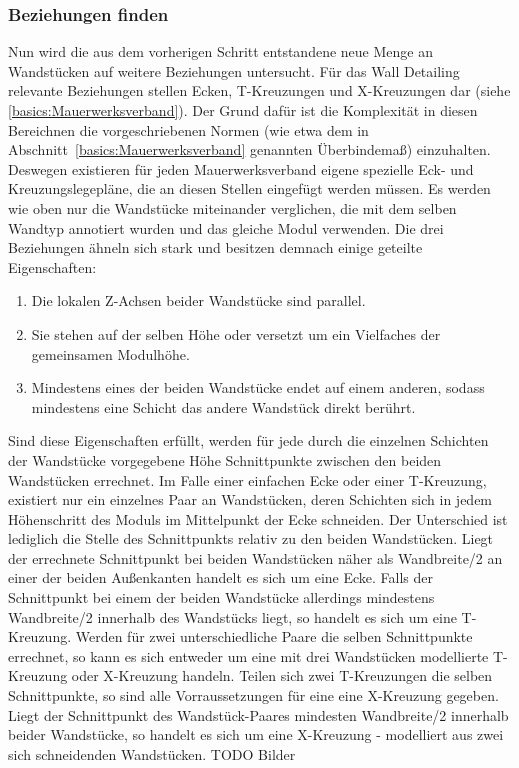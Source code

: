 \subsubsection{Beziehungen finden}
Nun wird die aus dem vorherigen Schritt entstandene neue Menge an Wandstücken auf weitere Beziehungen untersucht.
Für das Wall Detailing relevante Beziehungen stellen Ecken, T-Kreuzungen und X-Kreuzungen dar (siehe \ref{basics:Mauerwerksverband}).
Der Grund dafür ist die Komplexität in diesen Bereichnen die vorgeschriebenen Normen (wie etwa dem in Abschnitt~\ref{basics:Mauerwerksverband} genannten Überbindemaß) einzuhalten.
Deswegen existieren für jeden Mauerwerksverband eigene spezielle Eck- und Kreuzungslegepläne, die an diesen Stellen eingefügt werden müssen.
Es werden wie oben nur die Wandstücke miteinander verglichen, die mit dem selben Wandtyp annotiert wurden und das gleiche Modul verwenden.
Die drei Beziehungen ähneln sich stark und besitzen demnach einige geteilte Eigenschaften:
\begin{enumerate}
    \item Die lokalen Z-Achsen beider Wandstücke sind parallel.
    \item Sie stehen auf der selben Höhe oder versetzt um ein Vielfaches der gemeinsamen Modulhöhe.
    \item Mindestens eines der beiden Wandstücke endet auf einem anderen, sodass mindestens eine Schicht das andere Wandstück direkt berührt.
\end{enumerate}
Sind diese Eigenschaften erfüllt, werden für jede durch die einzelnen Schichten der Wandstücke vorgegebene Höhe Schnittpunkte zwischen den beiden Wandstücken errechnet.
Im Falle einer einfachen Ecke oder einer T-Kreuzung, existiert nur ein einzelnes Paar an Wandstücken, deren Schichten sich in jedem Höhenschritt des Moduls im Mittelpunkt der Ecke schneiden.
Der Unterschied ist lediglich die Stelle des Schnittpunkts relativ zu den beiden Wandstücken.
Liegt der errechnete Schnittpunkt bei beiden Wandstücken näher als Wandbreite/2 an einer der beiden Außenkanten handelt es sich um eine Ecke.
Falls der Schnittpunkt bei einem der beiden Wandstücke allerdings mindestens Wandbreite/2 innerhalb des Wandstücks liegt, so handelt es sich um eine T-Kreuzung.
Werden für zwei unterschiedliche Paare die selben Schnittpunkte errechnet, so kann es sich entweder um eine mit drei Wandstücken modellierte T-Kreuzung oder X-Kreuzung handeln.
Teilen sich zwei T-Kreuzungen die selben Schnittpunkte, so sind alle Vorraussetzungen für eine eine X-Kreuzung gegeben.
Liegt der Schnittpunkt des Wandstück-Paares mindesten Wandbreite/2 innerhalb beider Wandstücke, so handelt es sich um eine X-Kreuzung - modelliert aus zwei sich schneidenden Wandstücken. 
TODO Bilder

